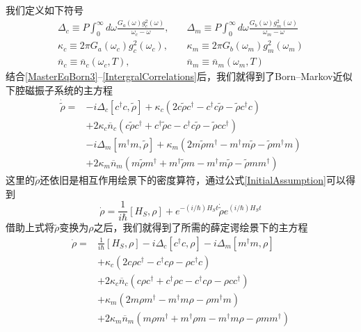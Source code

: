 我们定义如下符号
\begin{align}
\Delta_c \equiv P \int_{0}^{\infty} d \omega \frac{G_a(\omega) g_{c}^{2}(\omega)}{\omega_{c}-\omega},
&\quad \Delta_m \equiv P \int_{0}^{\infty} d \omega \frac{G_b(\omega) g_{m}^{2}(\omega)}{\omega_{m}-\omega} \\
\kappa_c \equiv 2 \pi G_a\left(\omega_{c}\right)g_{c}^{2}(\omega_c),
&\quad \kappa_m \equiv 2 \pi G_b\left(\omega_{m}\right)g_{m}^{2}(\omega_m) \\
\overline{n}_c \equiv \overline{n}_c\left(\omega_{c}, T\right),
&\quad \overline{n}_m \equiv \overline{n}_m\left(\omega_{m}, T\right)
\end{align}
结合\eqref{MasterEqBorn3}--\eqref{IntergralCorrelations}后，我们就得到了Born--Markov近似下腔磁振子系统的主方程
\begin{equation}
\begin{aligned}
\dot{\tilde{\rho}}={}&-i \Delta_c\left[c^{\dagger} c, \tilde{\rho}\right]+\kappa_c\left(2 c \tilde{\rho} c^{\dagger}-c^{\dagger} c \tilde{\rho}-\tilde{\rho} c^{\dagger} c\right) \\
&+2 \kappa_c \overline{n}_c\left(c \tilde{\rho} c^{\dagger}+c^{\dagger} \tilde{\rho} c-c^{\dagger} c \tilde{\rho}-\tilde{\rho} c c^{\dagger}\right) \\
&-i \Delta_m\left[m^{\dagger} m, \tilde{\rho}\right]+\kappa_m\left(2 m \tilde{\rho} m^{\dagger}-m^{\dagger} m \tilde{\rho}-\tilde{\rho} m^{\dagger} m\right) \\
&+2 \kappa_m \overline{n}_m\left(m \tilde{\rho} m^{\dagger}+m^{\dagger} \tilde{\rho} m-m^{\dagger} m \tilde{\rho}-\tilde{\rho} m m^{\dagger}\right)
\end{aligned}
\end{equation}
这里的$\tilde{\rho}$还依旧是相互作用绘景下的密度算符，通过公式\eqref{InitialAssumption}可以得到
\begin{equation}
\dot{\rho}=\frac{1}{i \hbar}\left[H_{S}, \rho\right]+e^{-(i / \hbar) H_{S} t} \dot{\tilde{\rho}} e^{(i / \hbar) H_{S} t}
\end{equation}
借助上式将$\tilde{\rho}$变换为$\rho$之后，我们就得到了所需的薛定谔绘景下的主方程
\begin{equation}
\begin{aligned}
\dot{\rho}={}&\frac{1}{i \hbar}\left[H_{S}, \rho\right]-i \Delta_c\left[c^{\dagger} c, \rho\right]-i \Delta_m\left[m^{\dagger} m, \rho\right] \\
&+\kappa_c\left(2 c \rho c^{\dagger}-c^{\dagger} c \rho-\rho c^{\dagger} c\right) \\
&+2 \kappa_c \overline{n}_c\left(c \rho c^{\dagger}+c^{\dagger} \rho c-c^{\dagger} c \rho-\rho c c^{\dagger}\right) \\
&+\kappa_m\left(2 m \rho m^{\dagger}-m^{\dagger} m \rho-\rho m^{\dagger} m\right) \\
&+2 \kappa_m \overline{n}_m\left(m \rho m^{\dagger}+m^{\dagger} \rho m-m^{\dagger} m \rho-\rho m m^{\dagger}\right)
\end{aligned}
\end{equation}
